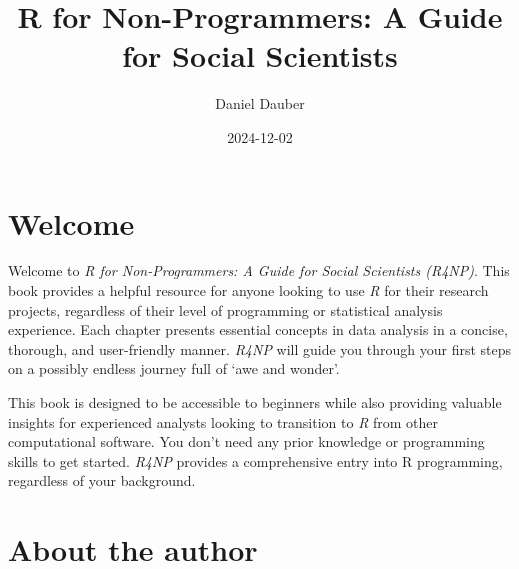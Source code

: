 \documentclass[
  letterpaper,
]{krantz}
\title{R for Non-Programmers: A Guide for Social Scientists}
\author{Daniel Dauber}
\date{2024-12-02}
\renewcommand*\contentsname{Table of contents}
\newcommand\contentsname{Table of contents}
\begin{document}
\maketitle


\thispagestyle{empty}

\begin{center}
\end{center}

\setlength{\abovedisplayskip}{-5pt}
\setlength{\abovedisplayshortskip}{-5pt}

\renewcommand*\contentsname{Table of contents}
{
\hypersetup{linkcolor=}
\setcounter{tocdepth}{2}
\tableofcontents
}

\chapter*{Welcome}\label{welcome}


Welcome to \emph{R for Non-Programmers: A Guide for Social Scientists
(R4NP)}. This book provides a helpful resource for anyone looking to use
\emph{R} for their research projects, regardless of their level of
programming or statistical analysis experience. Each chapter presents
essential concepts in data analysis in a concise, thorough, and
user-friendly manner. \emph{R4NP} will guide you through your first
steps on a possibly endless journey full of `awe and wonder'.

This book is designed to be accessible to beginners while also providing
valuable insights for experienced analysts looking to transition to
\emph{R} from other computational software. You don't need any prior
knowledge or programming skills to get started. \emph{R4NP} provides a
comprehensive entry into R programming, regardless of your background.

\mainmatter


\chapter*{About the author}\label{sec-about-the-author}
\end{document}
